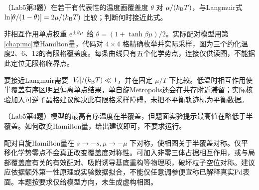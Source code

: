 \begin{example}
（Lab5第3题）在若干有代表性的温度画覆盖度 $\theta$ 对 $\mu/(k_{\mathrm B} T)$，与Langmuir式 $\ln[\theta/(1-\theta)]=2\mu/(k_{\mathrm B} T)$ 比较；判断何时接近此式。
\end{example}
\begin{solution}
非相互作用单点权重 $\mathrm e^{\pm\beta\mu}$ 给 $\theta=(1+\tanh\beta\mu)/2$。实际配对模型用第\ref{chap:mc}章Hamilton量，代码对 $4\times4$ 格精确枚举并实际采样，图为三个约化温度2、6、12的有限格覆盖度。每条曲线只有五个化学势点，连接仅供读图，不能据此定位无限格临界点。
\begin{center}\end{center}
要接近Langmuir需要 $|V_i|/(k_{\mathrm B} T)\ll1$，并在固定 $\mu/T$ 下比较。低温时相互作用使半覆盖有序区明显偏离单点结果，单自旋Metropolis还会在共存附近滞留；实际核验加入可逆子晶格建议解决此有限格采样障碍，未把不平衡轨迹标为平衡数据。
\end{solution}

\begin{example}
（Lab5第4题）模型的最高有序温度在半覆盖，但题面实验提示最高值在略低于半覆盖。如何改变Hamilton量，给出建议即可，不要求运行。
\end{example}
\begin{solution}
配对自旋Hamilton量在 $s\to-s,\mu\to-\mu$ 下对称，使相图关于半覆盖对称。仅平移化学势零点不会真正改变覆盖度对称性。可加入非零三体占据相互作用，或与局部覆盖度有关的有效配对、吸附诱导基底重构等物理项，破坏粒子空位对称。建议应依据额外第一性原理或实验数据拟合，不能仅任意调参便宣称已解释真实Pd表面。本题按要求仅给模型方向，未生成虚构相图。
\end{solution}
